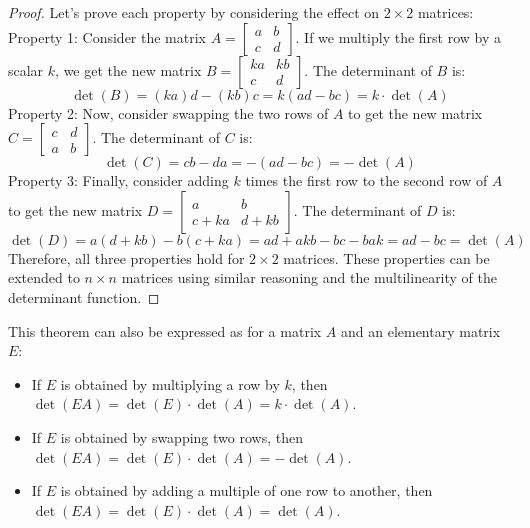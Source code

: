 \begin{proof}
    Let's prove each property by considering the effect on $2 \times 2$ matrices: \\
    Property 1: Consider the matrix \(A = \begin{bmatrix}
        a & b \\
        c & d
    \end{bmatrix}\). If we multiply the first row by a scalar \(k\), we get the new matrix \(B = \begin{bmatrix}
        ka & kb \\
        c & d
    \end{bmatrix}\). The determinant of \(B\) is:
    \[
        \det(B) = (ka)d - (kb)c = k(ad - bc) = k \cdot \det(A)
    \]
    Property 2: Now, consider swapping the two rows of \(A\) to get the new matrix \(C = \begin{bmatrix}
        c & d \\
        a & b
    \end{bmatrix}\). The determinant of \(C\) is:
    \[
        \det(C) = cb - da = -(ad - bc) = -\det(A)
    \]
    Property 3: Finally, consider adding \(k\) times the first row to the second row of \(A\) to get the new matrix \(D = \begin{bmatrix}
        a & b \\
        c + ka & d + kb
    \end{bmatrix}\). The determinant of \(D\) is:
    \[
        \det(D) = a(d + kb) - b(c + ka) = ad + akb - bc - bak = ad - bc = \det(A)
    \]
    Therefore, all three properties hold for \(2 \times 2\) matrices. These properties can be extended to \(n \times n\) matrices using similar reasoning and the multilinearity of the determinant function.
\end{proof}
This theorem can also be expressed as for a matrix $A$ and an elementary matrix $E$:
\begin{itemize}[itemsep=1pt,label=$\circ$]
    \item If \(E\) is obtained by multiplying a row by \(k\), then \(\det(EA) = \det(E) \cdot \det(A) = k \cdot \det(A)\).
    \item If \(E\) is obtained by swapping two rows, then \(\det(EA) = \det(E) \cdot \det(A) = -\det(A)\).
    \item If \(E\) is obtained by adding a multiple of one row to another, then \(\det(EA) = \det(E) \cdot \det(A) = \det(A)\).
\end{itemize}


